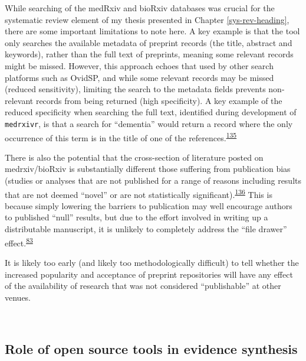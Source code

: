 \documentclass[a4paper, twoside]{templates/ociamthesis}
\begin{document}
While searching of the medRxiv and bioRxiv databases was crucial for the systematic review element of my thesis presented in Chapter \ref{sys-rev-heading}, there are some important limitations to note here. A key example is that the tool only searches the available metadata of preprint records (the title, abstract and keywords), rather than the full text of preprints, meaning some relevant records might be missed. However, this approach echoes that used by other search platforms such as OvidSP, and while some relevant records may be missed (reduced sensitivity), limiting the search to the metadata fields prevents non-relevant records from being returned (high specificity). A key example of the reduced specificity when searching the full text, identified during development of \texttt{medrxivr}, is that a search for ``dementia'' would return a record where the only occurrence of this term is in the title of one of the references.\textsuperscript{\protect\hyperlink{ref-bong2019}{135}}

There is also the potential that the cross-section of literature posted on medrxiv/bioRxiv is substantially different those suffering from publication bias (studies or analyses that are not published for a range of reasons including results that are not deemed ``novel'' or are not statistically significant).\textsuperscript{\protect\hyperlink{ref-song2010}{136}} This is because simply lowering the barriers to publication may well encourage authors to published ``null'' results, but due to the effort involved in writing up a distributable manuscript, it is unlikely to completely address the ``file drawer'' effect.\textsuperscript{\protect\hyperlink{ref-rosenthal1979}{83}}

It is likely too early (and likely too methodologically difficult) to tell whether the increased popularity and acceptance of preprint repositories will have any effect of the availability of research that was not considered ``publishable'' at other venues.

~

\hypertarget{role-of-open-source-tools-in-evidence-synthesis}{%
\subsection{Role of open source tools in evidence synthesis}\label{role-of-open-source-tools-in-evidence-synthesis}}
\end{document}
